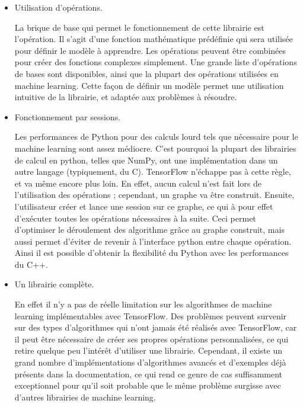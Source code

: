 \begin{itemize}
\item Utilisation d'opérations.

La brique de base qui permet le fonctionnement de cette librairie est l'opération. Il s'agit d'une fonction mathématique prédéfinie qui sera utilisée pour définir le modèle à apprendre. Les opérations peuvent être combinées pour créer des fonctions complexes simplement. Une grande liste d'opérations de bases sont disponibles, ainsi que la plupart des opérations utilisées en machine learning.
Cette façon de définir un modèle permet une utilisation intuitive de la librairie, et adaptée aux problèmes à résoudre.
\\
\item Fonctionnement par sessions. 

Les performances de Python pour des calculs lourd tels que nécessaire pour le machine learning sont assez médiocre. C'est pourquoi la plupart des librairies de calcul en python, telles que NumPy, ont une implémentation dans un autre langage (typiquement, du C). TensorFlow n'échappe pas à cette règle, et va même encore plus loin. En effet, aucun calcul n'est fait lors de l'utilisation des opérations ; cependant, un graphe va être construit. Ensuite, l'utilisateur créer et lance une session sur ce graphe, ce qui à pour effet d'exécuter toutes les opérations nécessaires à la suite.
Ceci permet d'optimiser le déroulement des algorithme grâce au graphe construit, mais aussi permet d'éviter de revenir à l'interface python entre chaque opération. Ainsi il est possible d'obtenir la flexibilité du Python avec les performances du C++.
\\
\item Un librairie complète. 

En effet il n'y a pas de réelle limitation sur les algorithmes de machine learning implémentables avec TensorFlow. Des problèmes peuvent survenir sur des types d'algorithmes qui n'ont jamais été réalisés avec TensorFlow, car il peut être nécessaire de créer ses propres opérations personnalisées, ce qui retire quelque peu l'intérêt d'utiliser une librairie. 
Cependant, il existe  un grand nombre d'implémentations d'algorithmes avancés et d'exemples déjà présents dans la documentation, ce qui rend ce genre de cas suffisamment exceptionnel pour qu'il soit probable que le même problème surgisse avec d'autres librairies de machine learning.
\end{itemize}



